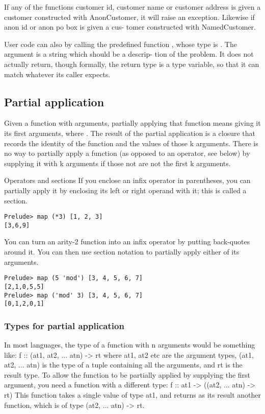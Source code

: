 If any of the functions customer id,
customer name or customer address is given
a customer constructed with AnonCustomer, it will
raise an exception.
Likewise if anon id or anon po box is given a cus-
tomer constructed with NamedCustomer.

User code can also  by calling the
predefined function , whose type is .
The argument is a string which should be a descrip-
tion of the problem. It does not actually return,
though formally, the return type is a type variable,
so that it can match whatever its caller expects.



\subsection{Partial application}
Given a function with  arguments, partially applying that function means giving it its first  arguments, where .
The result of the partial application is a closure
that records the identity of the function and the
values of those k arguments. There is no way to partially apply a function
(as opposed to an operator, see below) by supplying
it with k arguments if those not are not the first k
arguments.

Operators and sections
If you enclose an infix operator in parentheses, you
can partially apply it by enclosing its left or right
operand with it; this is called a section.
\begin{lstlisting}
Prelude> map (*3) [1, 2, 3]
[3,6,9]
\end{lstlisting}
You can turn an arity-2 function into an infix 
operator by putting back-quotes around it. You can
then use section notation to partially apply either
of its arguments.
\begin{lstlisting}
Prelude> map (5 'mod') [3, 4, 5, 6, 7]
[2,1,0,5,5]
Prelude> map ('mod' 3) [3, 4, 5, 6, 7]
[0,1,2,0,1]
\end{lstlisting}

\subsubsection{Types for partial application}
In most languages, the type of a function with n
arguments would be something like:
f :: (at1, at2, ... atn) -> rt
where at1, at2 etc are the argument types, (at1,
at2, ... atn) is the type of a tuple containing
all the arguments, and rt is the result type.
To allow the function to be partially applied by
supplying the first argument, you need a function
with a different type:
f :: at1 -> ((at2, ... atn) -> rt)
This function takes a single value of type at1, and
returns as its result another function, which is of
type (at2, ... atn) -> rt.

